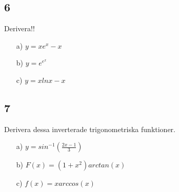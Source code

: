 \documentclass{article}
\begin{document}
\subsection*{6}
Derivera!!
\begin{itemize}
    \item[a) ] $y = x e^x - x$
    \item[b) ] $y = e^{e^x}$
    \item[c) ] $y = x ln x - x$
\end{itemize}

\subsection*{7}
Derivera dessa inverterade trigonometriska funktioner. \\
\begin{itemize}
    \item[a) ] $y = sin^{-1}(\frac{2x-1}{3})$
    \item[b) ] $F(x) = (1+x^2)arctan(x)$ 
    \item[c) ] $f(x) = xarccos(x)$
\end{itemize}
\end{document}
